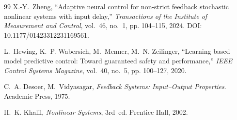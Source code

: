 \documentclass[11pt,sagev,times]{sagej}
\begin{document}
\begin{thebibliography}{99}
X.-Y.~Zheng,
``Adaptive neural control for non-strict feedback stochastic nonlinear
systems with input delay,''
\emph{Transactions of the Institute of Measurement and Control},
vol.~46, no.~1, pp. 104--115, 2024. DOI: 10.1177/01423312231169561.

L.~Hewing, K.~P. Wabersich, M.~Menner, M.~N. Zeilinger,
``Learning-based model predictive control: Toward guaranteed safety and
performance,''
\emph{IEEE Control Systems Magazine}, vol.~40, no.~5, pp. 100--127, 2020.

C.~A. Desoer, M.~Vidyasagar,
\emph{Feedback Systems: Input--Output Properties}. Academic Press, 1975.

H.~K. Khalil, \emph{Nonlinear Systems}, 3rd~ed. Prentice Hall, 2002.

\end{thebibliography}
\end{document}
